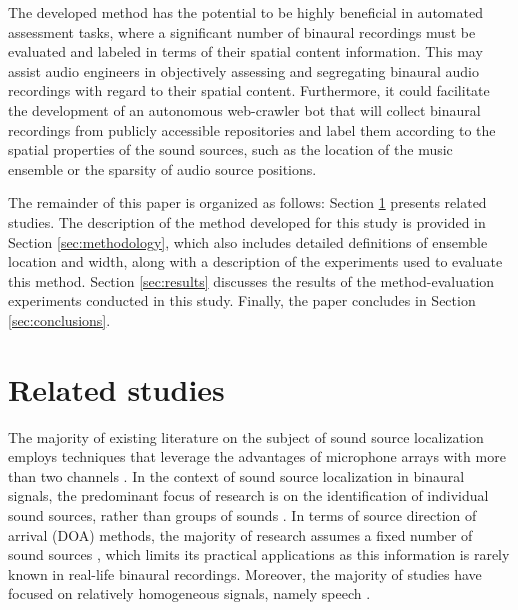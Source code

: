\documentclass{article}
\begin{document}
The developed method has the potential to be highly beneficial in automated assessment tasks, where a significant number of binaural recordings must be evaluated and labeled in terms of their spatial content information. This may assist audio engineers in objectively assessing and segregating binaural audio recordings with regard to their spatial content. Furthermore, it could facilitate the development of an autonomous web-crawler bot that will collect binaural recordings from publicly accessible repositories and label them according to the spatial properties of the sound sources, such as the location of the music ensemble or the sparsity of audio source positions.

The remainder of this paper is organized as follows: Section \ref{sec:related-studies} presents related studies. The description of the method developed for this study is provided in Section \ref{sec:methodology}, which also includes detailed definitions of ensemble location and width, along with a description of the experiments used to evaluate this method. Section \ref{sec:results} discusses the results of the method-evaluation experiments conducted in this study. Finally, the paper concludes in Section \ref{sec:conclusions}.

\section{Related studies}
\label{sec:related-studies}

The majority of existing literature on the subject of sound source localization employs techniques that leverage the advantages of microphone arrays with more than two channels \parencite{kaveh_statistical_1986, pavlidi_real-time_2012, pan_multi-tone_2021, hahmann_sound_2022, chung_sound_2022, liu_sound_2022}. In the context of sound source localization in binaural signals, the predominant focus of research is on the identification of individual sound sources, rather than groups of sounds \parencite{dietz_auditory_2011, may_probabilistic_2011, may_binaural_2012, woodruff_binaural_2012, may_robust_2015, ma16c_interspeech, ma_exploiting_2017, benaroya_binaural_2018}. In terms of source direction of arrival (DOA) methods, the majority of research assumes a fixed number of sound sources \parencite{pang_multitask_2019, vera-diaz_towards_2018, ma_exploiting_2017, woodruff_binaural_2012, arthi_spatiogram_2021}, which limits its practical applications as this information is rarely known in real-life binaural recordings. Moreover, the majority of studies have focused on relatively homogeneous signals, namely speech \parencite{dietz_auditory_2011, may_probabilistic_2011, may_binaural_2012, woodruff_binaural_2012, may_robust_2015, ma16c_interspeech, ma_exploiting_2017, benaroya_binaural_2018, wang_binaural_2020, liu_multiple_2018, yang_deepear_2022, ma_robust_2018}.
\end{document}
